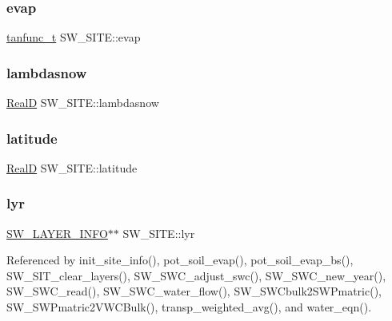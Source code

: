 \subsubsection{\texorpdfstring{evap}{evap}}
{\footnotesize\ttfamily \hyperlink{structtanfunc__t}{tanfunc\+\_\+t} S\+W\+\_\+\+S\+I\+T\+E\+::evap}

\mbox{\label{struct_s_w___s_i_t_e_ae5f7fa59995e2f5bcee83c33a216f223}} 
\subsubsection{\texorpdfstring{lambdasnow}{lambdasnow}}
{\footnotesize\ttfamily \hyperlink{generic_8h_af1c105fd5732f70b91ddaeda0cc340e3}{RealD} S\+W\+\_\+\+S\+I\+T\+E\+::lambdasnow}

\mbox{\label{struct_s_w___s_i_t_e_a1ee73c3e369f34738a512a3cfb347f6c}} 
\subsubsection{\texorpdfstring{latitude}{latitude}}
{\footnotesize\ttfamily \hyperlink{generic_8h_af1c105fd5732f70b91ddaeda0cc340e3}{RealD} S\+W\+\_\+\+S\+I\+T\+E\+::latitude}

\mbox{\label{struct_s_w___s_i_t_e_a95e72b7c2bc0c4e6ebb4a5dbd56855ce}} 
\subsubsection{\texorpdfstring{lyr}{lyr}}
{\footnotesize\ttfamily \hyperlink{struct_s_w___l_a_y_e_r___i_n_f_o}{S\+W\+\_\+\+L\+A\+Y\+E\+R\+\_\+\+I\+N\+FO}$\ast$$\ast$ S\+W\+\_\+\+S\+I\+T\+E\+::lyr}



Referenced by init\+\_\+site\+\_\+info(), pot\+\_\+soil\+\_\+evap(), pot\+\_\+soil\+\_\+evap\+\_\+bs(), S\+W\+\_\+\+S\+I\+T\+\_\+clear\+\_\+layers(), S\+W\+\_\+\+S\+W\+C\+\_\+adjust\+\_\+swc(), S\+W\+\_\+\+S\+W\+C\+\_\+new\+\_\+year(), S\+W\+\_\+\+S\+W\+C\+\_\+read(), S\+W\+\_\+\+S\+W\+C\+\_\+water\+\_\+flow(), S\+W\+\_\+\+S\+W\+Cbulk2\+S\+W\+Pmatric(), S\+W\+\_\+\+S\+W\+Pmatric2\+V\+W\+C\+Bulk(), transp\+\_\+weighted\+\_\+avg(), and water\+\_\+eqn().

